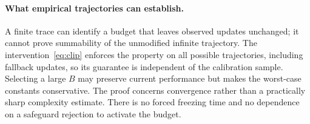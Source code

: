 \documentclass[11pt]{article}
\begin{document}
\paragraph{What empirical trajectories can establish.}
A finite trace can identify a budget that leaves observed updates unchanged; it cannot prove summability of the unmodified infinite trajectory.
The intervention~\eqref{eq:clip} enforces the property on all possible trajectories, including fallback updates, so its guarantee is independent of the calibration sample.
Selecting a large $B$ may preserve current performance but makes the worst-case constants conservative.
The proof concerns convergence rather than a practically sharp complexity estimate.
There is no forced freezing time and no dependence on a safeguard rejection to activate the budget.
\end{document}
